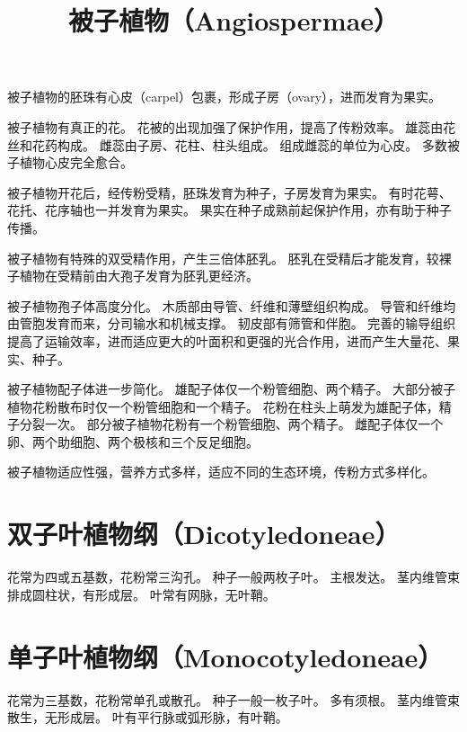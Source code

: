 \documentclass[11pt]{article}
\title{被子植物（Angiospermae）}
\author{}
\date{}
\begin{document}
\begin{sloppypar}
  \maketitle

  \linenumbers
被子植物的胚珠有心皮（carpel）包裹，形成子房（ovary），进而发育为果实。

\par

被子植物有真正的花。
花被的出现加强了保护作用，提高了传粉效率。
雄蕊由花丝和花药构成。
雌蕊由子房、花柱、柱头组成。
组成雌蕊的单位为心皮。
多数被子植物心皮完全愈合。

\par

被子植物开花后，经传粉受精，胚珠发育为种子，子房发育为果实。
有时花萼、花托、花序轴也一并发育为果实。
果实在种子成熟前起保护作用，亦有助于种子传播。

\par

被子植物有特殊的双受精作用，产生三倍体胚乳。
胚乳在受精后才能发育，较裸子植物在受精前由大孢子发育为胚乳更经济。

\par

被子植物孢子体高度分化。
木质部由导管、纤维和薄壁组织构成。
导管和纤维均由管胞发育而来，分司输水和机械支撑。
韧皮部有筛管和伴胞。
完善的输导组织提高了运输效率，进而适应更大的叶面积和更强的光合作用，进而产生大量花、果实、种子。

\par

被子植物配子体进一步简化。
雄配子体仅一个粉管细胞、两个精子。
大部分被子植物花粉散布时仅一个粉管细胞和一个精子。
花粉在柱头上萌发为雄配子体，精子分裂一次。
部分被子植物花粉有一个粉管细胞、两个精子。
雌配子体仅一个卵、两个助细胞、两个极核和三个反足细胞。

\par

被子植物适应性强，营养方式多样，适应不同的生态环境，传粉方式多样化。

\section{双子叶植物纲（Dicotyledoneae）}
花常为四或五基数，花粉常三沟孔。
种子一般两枚子叶。
主根发达。
茎内维管束排成圆柱状，有形成层。
叶常有网脉，无叶鞘。

\section{单子叶植物纲（Monocotyledoneae）}
花常为三基数，花粉常单孔或散孔。
种子一般一枚子叶。
多有须根。
茎内维管束散生，无形成层。
叶有平行脉或弧形脉，有叶鞘。

\end{sloppypar}
\end{document}
